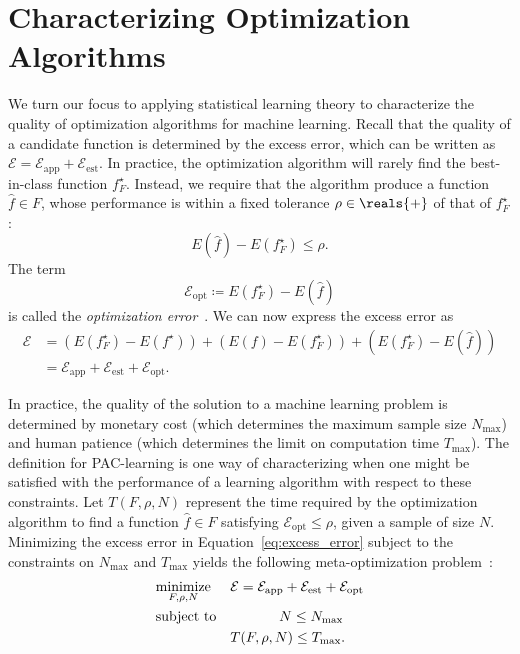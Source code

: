 \documentclass[11pt,a4paper]{article}
\numberwithin{equation}{section}
\newcommand{\apperr}{\mathcal{E}_{\mathrm{app}}}
\newcommand{\esterr}{\mathcal{E}_{\mathrm{est}}}
\newcommand{\opterr}{\mathcal{E}_{\mathrm{opt}}}
\begin{document}
\section{Characterizing Optimization Algorithms}

We turn our focus to applying statistical learning theory to characterize the
quality of optimization algorithms for machine learning. Recall that the
quality of a candidate function is determined by the excess error, which can be
written as $\mathcal{E} = \apperr + \esterr$. In practice, the optimization
algorithm will rarely find the best-in-class function $f_F^\star$. Instead, we
require that the algorithm produce a function $\hat{f} \in F$, whose performance
is within a fixed tolerance $\rho \in \reals{+}$ of that of $f_F^\star$:
\[
	E(\hat{f}) - E(f_F^\star) \leq \rho.
\]
The term
\[
	\opterr \coloneqq E(f_F^\star) - E(\hat{f})
\]
is called the \emph{optimization error}~\citep{bousquet2008tradeoffs}. We can
now express the excess error as
\begin{align}
	\mathcal{E}
	&= (E(f_F^\star) - E(f^\star)) + (E(f) - E(f_F^\star)) +
		(E(f_F^\star) - E(\hat{f})) \\
	&= \apperr + \esterr + \opterr.
	\label{eq:excess_error}
\end{align}

In practice, the quality of the solution to a machine learning problem is
determined by monetary cost (which determines the maximum sample size
$N_{\text{max}}$) and human patience (which determines the limit on
computation time $T_{\text{max}}$). The definition for PAC-learning is one way
of characterizing when one might be satisfied with the performance of a learning
algorithm with respect to these constraints. Let $T(F, \rho, N)$ represent the
time required by the optimization algorithm to find a function $\hat{f} \in F$
satisfying $\opterr \leq \rho$, given a sample of size $N$. Minimizing the
excess error in Equation~\ref{eq:excess_error} subject to the constraints on
$N_{\text{max}}$ and $T_{\text{max}}$ yields the following meta-optimization
problem~\citep{bousquet2008tradeoffs}:
\begin{equation}
\begin{aligned}
	& \underset{F, \rho, N}{\text{minimize}} & &
		\mathcal{E} = \apperr + \esterr + \opterr \\
	& \text{subject to} & & \hspace{3.5em} N \leq N_{\text{max}} \\
	& & & T(F, \rho, N) \leq T_{\text{max}}.
\end{aligned}
\end{equation}
\end{document}
